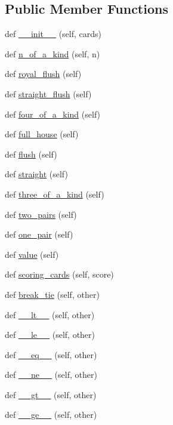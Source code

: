 \subsection*{Public Member Functions}
\begin{DoxyCompactItemize}
\item 
def \hyperlink{classcards_1_1Hand_af800ad698281536204b51b71fb8ed15d}{\+\_\+\+\_\+init\+\_\+\+\_\+} (self, cards)
\item 
def \hyperlink{classcards_1_1Hand_a69f3ca64f85f68517e1aff96eecddf88}{n\+\_\+of\+\_\+a\+\_\+kind} (self, n)
\item 
def \hyperlink{classcards_1_1Hand_a6f47baa991d8cbc19de475dedc913c5d}{royal\+\_\+flush} (self)
\item 
def \hyperlink{classcards_1_1Hand_a968d069f9496b9be0b776cf556c9cc3e}{straight\+\_\+flush} (self)
\item 
def \hyperlink{classcards_1_1Hand_a154a7212af3b6230948078e83a5522a3}{four\+\_\+of\+\_\+a\+\_\+kind} (self)
\item 
def \hyperlink{classcards_1_1Hand_aa884f0c9ac8cb9e0d525fa6dd5f3b468}{full\+\_\+house} (self)
\item 
def \hyperlink{classcards_1_1Hand_a82d4acb563e208e8622948b436eceb60}{flush} (self)
\item 
def \hyperlink{classcards_1_1Hand_a29d0bc084338ab312ad249dc33e2f957}{straight} (self)
\item 
def \hyperlink{classcards_1_1Hand_a38deb8800110f1077223a605e5096cf2}{three\+\_\+of\+\_\+a\+\_\+kind} (self)
\item 
def \hyperlink{classcards_1_1Hand_a4bc879b8db18b48d745aecac892fa79c}{two\+\_\+pairs} (self)
\item 
def \hyperlink{classcards_1_1Hand_a0b6c8668a89a95ee985f475ae5b6775a}{one\+\_\+pair} (self)
\item 
def \hyperlink{classcards_1_1Hand_a52b92cc78391802ad2b9182bc326a403}{value} (self)
\item 
def \hyperlink{classcards_1_1Hand_a42ceab50738615707ec65667d1802496}{scoring\+\_\+cards} (self, score)
\item 
def \hyperlink{classcards_1_1Hand_aabc65985f97f74cefd0b550c3f47e652}{break\+\_\+tie} (self, other)
\item 
def \hyperlink{classcards_1_1Hand_a82fa918741361692526417b3295242dc}{\+\_\+\+\_\+lt\+\_\+\+\_\+} (self, other)
\item 
def \hyperlink{classcards_1_1Hand_a817ee76b140e59bf5c1e933283e5fb52}{\+\_\+\+\_\+le\+\_\+\+\_\+} (self, other)
\item 
def \hyperlink{classcards_1_1Hand_a1db1734329cd4a3be5a51447a1431646}{\+\_\+\+\_\+eq\+\_\+\+\_\+} (self, other)
\item 
def \hyperlink{classcards_1_1Hand_a35a85437e077522eef6448c863b6e570}{\+\_\+\+\_\+ne\+\_\+\+\_\+} (self, other)
\item 
def \hyperlink{classcards_1_1Hand_ae7d4f7a7e165bef7f32d6ed4c1781e6f}{\+\_\+\+\_\+gt\+\_\+\+\_\+} (self, other)
\item 
def \hyperlink{classcards_1_1Hand_a5d7400b5ff312926a03526db90acc22d}{\+\_\+\+\_\+ge\+\_\+\+\_\+} (self, other)
\end{DoxyCompactItemize}


